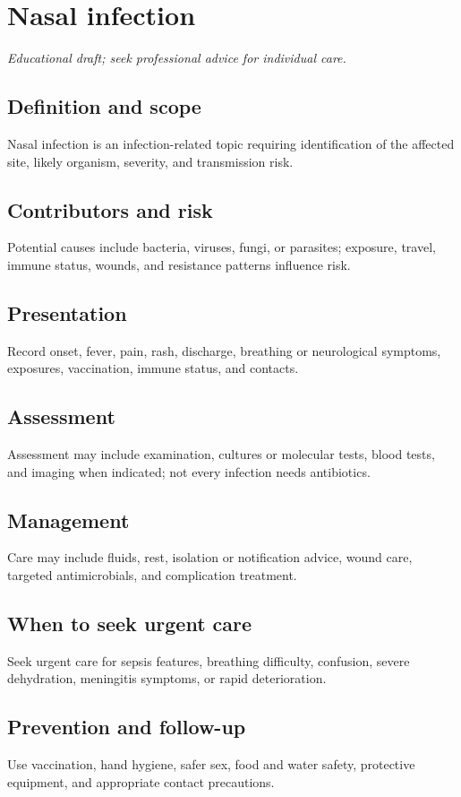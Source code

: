 \chapter{Nasal infection}

\medskip
\noindent\textit{Educational draft; seek professional advice for individual care.}

\section*{Definition and scope}
Nasal infection is an infection-related topic requiring identification of the affected site, likely organism, severity, and transmission risk.

\section*{Contributors and risk}
Potential causes include bacteria, viruses, fungi, or parasites; exposure, travel, immune status, wounds, and resistance patterns influence risk.

\section*{Presentation}
Record onset, fever, pain, rash, discharge, breathing or neurological symptoms, exposures, vaccination, immune status, and contacts.

\section*{Assessment}
Assessment may include examination, cultures or molecular tests, blood tests, and imaging when indicated; not every infection needs antibiotics.

\section*{Management}
Care may include fluids, rest, isolation or notification advice, wound care, targeted antimicrobials, and complication treatment.

\section*{When to seek urgent care}
Seek urgent care for sepsis features, breathing difficulty, confusion, severe dehydration, meningitis symptoms, or rapid deterioration.

\section*{Prevention and follow-up}
Use vaccination, hand hygiene, safer sex, food and water safety, protective equipment, and appropriate contact precautions.

